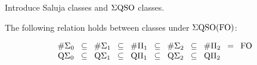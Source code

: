 Introduce Saluja classes and $\Sigma{\rm QSO}$ classes.

\begin{theorem}
	The following relation holds between classes under $\Sigma{\rm QSO}({\rm FO})$:
	
	\[
	\renewcommand{\arraycolsep}{1.4mm}
	\begin{array}{ccccccccccc}
		\E{0} & \subseteq & \E{1} & \subseteq & \U{1} & \subseteq & \E{2} & \subseteq & \U{2} & = & \fo \\
		\QE{0} & \subseteq & \QE{1} & \subseteq & \QU{1} & \subseteq & \QE{2} & \subseteq & \QU{2} &  &  \\
	\end{array}
	\]
	
\end{theorem}





%

